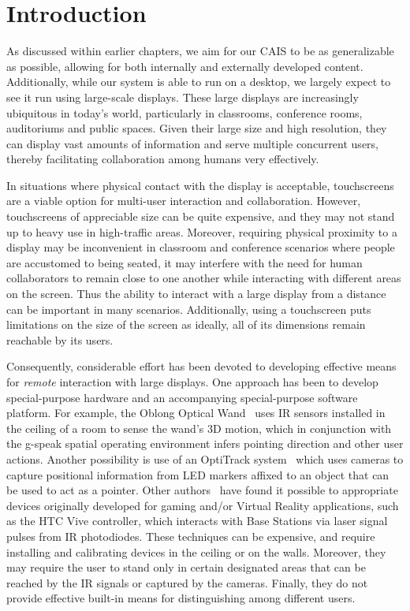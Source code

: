 \section{Introduction}\label{sec:03_introduction}

As discussed within earlier chapters, we aim for our CAIS to be as generalizable
as possible, allowing for both internally and externally developed content.
Additionally, while our system is able to run on a desktop, we largely expect
to see it run using large-scale displays. These large displays are increasingly
ubiquitous in today's world, particularly in classrooms, conference rooms, auditoriums and public spaces. Given their large size and high resolution, they can display vast amounts of information and serve multiple concurrent users, thereby facilitating collaboration among humans very effectively.

In situations where physical contact with the display is acceptable, touchscreens are a viable option for multi-user interaction and collaboration. However, touchscreens of appreciable size can be quite expensive, and they may not stand up to heavy use in high-traffic areas. Moreover, requiring physical proximity to a display may be inconvenient in classroom and conference scenarios where people are accustomed to being seated, it may interfere with the need for human collaborators to remain close to one another while interacting with different areas on the screen. Thus the ability to interact with a large display from a distance can be important in many scenarios. Additionally, using a touchscreen puts limitations on the size of the screen as ideally, all of its dimensions remain reachable by its users.

Consequently, considerable effort has been devoted to developing effective means for {\em remote} interaction with large displays. One approach has been to develop special-purpose hardware and an accompanying special-purpose software platform. For example, the Oblong Optical Wand~\cite{oblong_industries_inc_oblong_2019} uses IR sensors installed in the ceiling of a room to sense the wand's 3D motion, which in conjunction with the g-speak spatial operating environment infers pointing direction and other user actions. Another possibility is use of an OptiTrack system~\cite{nagymate_application_1970,langner_multiple_2019} which uses cameras to capture positional information from LED markers affixed to an object that can be used to act as a pointer. Other authors~\cite{kephart_embodied_2019} have found it possible to appropriate devices originally developed for gaming and/or Virtual Reality applications, such as the HTC Vive controller, which interacts with Base Stations via laser signal pulses from IR photodiodes. These techniques can be expensive, and require installing and calibrating devices in the ceiling or on the walls. Moreover, they may require the user to stand only in certain designated areas that can be reached by the IR signals or captured by the cameras. Finally, they do not provide effective built-in means for distinguishing among different users.

